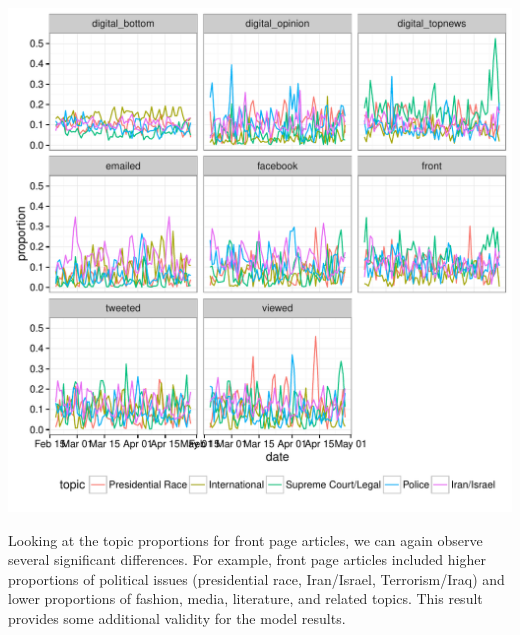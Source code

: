 \documentclass[12pt]{article}\usepackage[]{graphicx}\usepackage[]{color}
\makeatletter
\def\maxwidth{ %
  \ifdim\Gin@nat@width>\linewidth
    \linewidth
  \else
    \Gin@nat@width
  \fi
}
\newenvironment{knitrout}{}{} %
\makeatother
\begin{document}
\clearpage
\begin{knitrout}
\color{fgcolor}
\includegraphics[width=\maxwidth]{figure/unnamed-chunk-9-1} 

\end{knitrout}
Looking at the topic proportions for front page articles, we can again observe several significant differences. For example, front page articles included higher proportions of political issues (presidential race, Iran/Israel, Terrorism/Iraq) and lower proportions of fashion, media, literature, and related topics. This result provides some additional validity for the model results.
\end{document}
